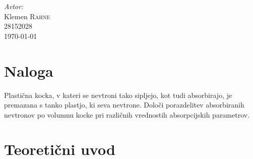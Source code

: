 \documentclass[slovene,11pt,a4paper]{article}
\numberwithin{equation}{section} %
\numberwithin{figure}{section} %
\numberwithin{table}{section} %
\begin{document}
\begin{titlepage}



\Large \emph{Avtor:}\\
Klemen \textsc{Rahne}\\
28152028\\[2cm]

{\large \today } \\[0.5cm] %

	

\end{titlepage}






\section{Naloga}
Plastična kocka, v kateri se nevtroni tako sipljejo, kot tudi absorbirajo, je premazana s tanko plastjo, ki seva nevtrone. Določi porazdelitev absorbiranih nevtronov po volumnu kocke pri različnih vrednostih absorpcijskih parametrov.

\section{Teoretični uvod}
\end{document}
